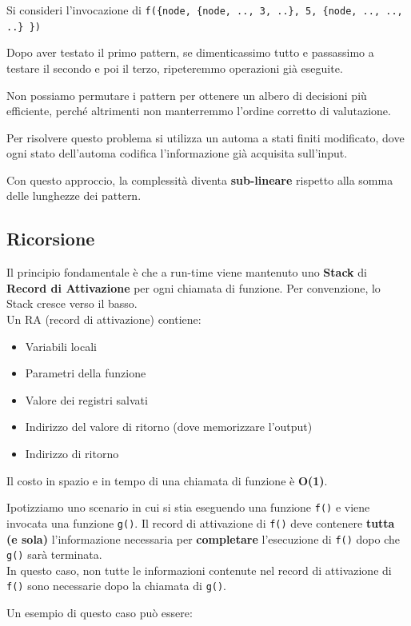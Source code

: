 \documentclass{article}
\begin{document}
Si consideri l'invocazione di \texttt{f(\{node, \{node, .., 3, ..\}, 5, \{node, .., .., ..\} \})}

Dopo aver testato il primo pattern, se dimenticassimo tutto e passassimo a testare il secondo e poi il terzo, ripeteremmo operazioni già eseguite.

Non possiamo permutare i pattern per ottenere un albero di decisioni più efficiente, perché altrimenti non manterremmo l'ordine corretto di valutazione.

Per risolvere questo problema si utilizza un automa a stati finiti modificato, dove ogni stato dell'automa codifica l'informazione già acquisita sull'input.

Con questo approccio, la complessità diventa \textbf{sub-lineare} rispetto alla somma delle lunghezze dei pattern.

\subsection*{Ricorsione}
Il principio fondamentale è che a run-time viene mantenuto uno \textbf{Stack} di \textbf{Record di Attivazione} per ogni chiamata di funzione. Per convenzione, lo Stack cresce verso il basso.\\
Un RA (record di attivazione) contiene:
\begin{itemize}
    \item Variabili locali
    \item Parametri della funzione
    \item Valore dei registri salvati
    \item Indirizzo del valore di ritorno (dove memorizzare l'output)
    \item Indirizzo di ritorno
\end{itemize}

Il costo in spazio e in tempo di una chiamata di funzione è \textbf{O(1)}.

Ipotizziamo uno scenario in cui si stia eseguendo una funzione \texttt{f()} e viene invocata una funzione \texttt{g()}. Il record di attivazione di \texttt{f()} deve contenere \textbf{tutta (e sola)} l'informazione necessaria per \textbf{completare} l'esecuzione di \texttt{f()} dopo che \texttt{g()} sarà terminata.\\
In questo caso, non tutte le informazioni contenute nel record di attivazione di \texttt{f()} sono necessarie dopo la chiamata di \texttt{g()}.

Un esempio di questo caso può essere:
\end{document}
